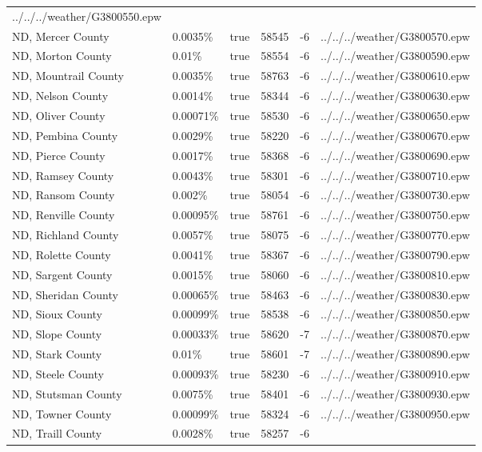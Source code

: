 \begin{longtable}[]{@{}llllll@{}}
../../../weather/G3800550.epw \\
ND, Mercer County & 0.0035\% & true & 58545 & -6 &
../../../weather/G3800570.epw \\
ND, Morton County & 0.01\% & true & 58554 & -6 &
../../../weather/G3800590.epw \\
ND, Mountrail County & 0.0035\% & true & 58763 & -6 &
../../../weather/G3800610.epw \\
ND, Nelson County & 0.0014\% & true & 58344 & -6 &
../../../weather/G3800630.epw \\
ND, Oliver County & 0.00071\% & true & 58530 & -6 &
../../../weather/G3800650.epw \\
ND, Pembina County & 0.0029\% & true & 58220 & -6 &
../../../weather/G3800670.epw \\
ND, Pierce County & 0.0017\% & true & 58368 & -6 &
../../../weather/G3800690.epw \\
ND, Ramsey County & 0.0043\% & true & 58301 & -6 &
../../../weather/G3800710.epw \\
ND, Ransom County & 0.002\% & true & 58054 & -6 &
../../../weather/G3800730.epw \\
ND, Renville County & 0.00095\% & true & 58761 & -6 &
../../../weather/G3800750.epw \\
ND, Richland County & 0.0057\% & true & 58075 & -6 &
../../../weather/G3800770.epw \\
ND, Rolette County & 0.0041\% & true & 58367 & -6 &
../../../weather/G3800790.epw \\
ND, Sargent County & 0.0015\% & true & 58060 & -6 &
../../../weather/G3800810.epw \\
ND, Sheridan County & 0.00065\% & true & 58463 & -6 &
../../../weather/G3800830.epw \\
ND, Sioux County & 0.00099\% & true & 58538 & -6 &
../../../weather/G3800850.epw \\
ND, Slope County & 0.00033\% & true & 58620 & -7 &
../../../weather/G3800870.epw \\
ND, Stark County & 0.01\% & true & 58601 & -7 &
../../../weather/G3800890.epw \\
ND, Steele County & 0.00093\% & true & 58230 & -6 &
../../../weather/G3800910.epw \\
ND, Stutsman County & 0.0075\% & true & 58401 & -6 &
../../../weather/G3800930.epw \\
ND, Towner County & 0.00099\% & true & 58324 & -6 &
../../../weather/G3800950.epw \\
ND, Traill County & 0.0028\% & true & 58257 & -6 &

\end{longtable}
